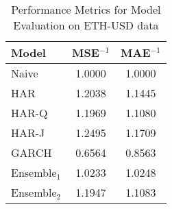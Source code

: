 \begin{table}[ht]
\begin{center}
\begin{minipage}[t]{0.3\textwidth}
        \small %
        \caption{Performance Metrics for Model Evaluation on ETH-USD data}
        \label{tab:model_metrics_B}
        \begin{tabular}{l S[table-format=1.4] S[table-format=1.4]}
            \toprule
             \textbf{Model} & \textbf{MSE$^{-1}$} & \textbf{MAE$^{-1}$} \\
            \midrule
            Naive               & 1.0000   & 1.0000 \\
            HAR                 & 1.2038   & 1.1445 \\
            HAR-Q               & 1.1969   & 1.1080 \\
            HAR-J               & 1.2495   & 1.1709 \\
            GARCH               & 0.6564   & 0.8563 \\
            Ensemble$_1$           & 1.0233   & 1.0248 \\
            Ensemble$_2$     & 1.1947   & 1.1083 \\
            \bottomrule
        \end{tabular}
    \end{minipage}
    \end{center}
\end{table}
